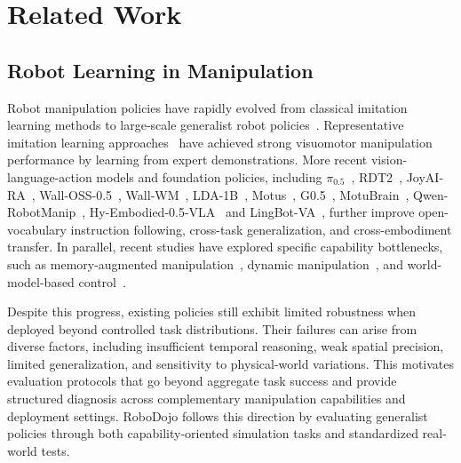 \section{Related Work}
\label{sec:related_work}

\subsection{Robot Learning in Manipulation}

Robot manipulation policies have rapidly evolved from classical imitation learning methods to large-scale generalist robot policies~\citep{kim2024openvla,chen2025benchmarking}. Representative imitation learning approaches~\citep{zhao2023learning,chiDiffusionPolicyVisuomotor2024,chen2025g3flow,ze20243ddiffusionpolicygeneralizable,liu2025avr} have achieved strong visuomotor manipulation performance by learning from expert demonstrations. More recent vision-language-action models and foundation policies, including $\pi_{0.5}$~\citep{intelligence2025pi_}, RDT2~\citep{rdt2}, JoyAI-RA~\citep{zhang2026joyai}, Wall-OSS-0.5~\citep{yu2026wall}, Wall-WM~\citep{li2026wall}, LDA-1B~\citep{lyu2026lda}, Motus~\citep{bi2026motus}, G0.5~\citep{galaxea2026g05}, MotuBrain~\citep{team2026motubrain}, Qwen-RobotManip~\citep{yuan2026qwen}, Hy-Embodied-0.5-VLA~\citep{zhang2026hy} and LingBot-VA~\citep{li2026causalworldmodelingrobot}, further improve open-vocabulary instruction following, cross-task generalization, and cross-embodiment transfer. In parallel, recent studies have explored specific capability bottlenecks, such as memory-augmented manipulation~\citep{shi2025memoryvla,torne2026memmultiscaleembodiedmemory}, dynamic manipulation~\citep{cai2026internvla}, and world-model-based control~\citep{intelligence2026pi07steerablegeneralistrobotic,bi2026motus,ye2026worldactionmodelszeroshot}.

Despite this progress, existing policies still exhibit limited robustness when deployed beyond controlled task distributions. Their failures can arise from diverse factors, including insufficient temporal reasoning, weak spatial precision, limited generalization, and sensitivity to physical-world variations. This motivates evaluation protocols that go beyond aggregate task success and provide structured diagnosis across complementary manipulation capabilities and deployment settings. RoboDojo follows this direction by evaluating generalist policies through both capability-oriented simulation tasks and standardized real-world tests.

